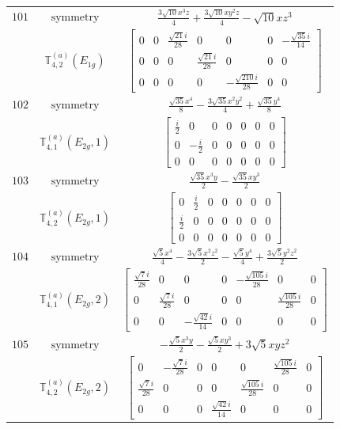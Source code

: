 \documentclass[fleqn,8pt,landscape]{jsarticle}
\begin{document}
\begin{longtable}{ccc}
$ 101 $ & $ \text{symmetry} $ & $ \frac{3 \sqrt{10} x^{3} z}{4} + \frac{3 \sqrt{10} x y^{2} z}{4} - \sqrt{10} x z^{3} $ \\
$  $ & $ \mathbb{T}_{4,2}^{(a)}(E_{1g}) $ & $ \begin{bmatrix} 0 & 0 & \frac{\sqrt{21} i}{28} & 0 & 0 & 0 & - \frac{\sqrt{35} i}{14} \\ 0 & 0 & 0 & \frac{\sqrt{21} i}{28} & 0 & 0 & 0 \\ 0 & 0 & 0 & 0 & - \frac{\sqrt{210} i}{28} & 0 & 0 \end{bmatrix} $ \\ \hline
$ 102 $ & $ \text{symmetry} $ & $ \frac{\sqrt{35} x^{4}}{8} - \frac{3 \sqrt{35} x^{2} y^{2}}{4} + \frac{\sqrt{35} y^{4}}{8} $ \\
$  $ & $ \mathbb{T}_{4,1}^{(a)}(E_{2g},1) $ & $ \begin{bmatrix} \frac{i}{2} & 0 & 0 & 0 & 0 & 0 & 0 \\ 0 & - \frac{i}{2} & 0 & 0 & 0 & 0 & 0 \\ 0 & 0 & 0 & 0 & 0 & 0 & 0 \end{bmatrix} $ \\ \hline
$ 103 $ & $ \text{symmetry} $ & $ \frac{\sqrt{35} x^{3} y}{2} - \frac{\sqrt{35} x y^{3}}{2} $ \\
$  $ & $ \mathbb{T}_{4,2}^{(a)}(E_{2g},1) $ & $ \begin{bmatrix} 0 & \frac{i}{2} & 0 & 0 & 0 & 0 & 0 \\ \frac{i}{2} & 0 & 0 & 0 & 0 & 0 & 0 \\ 0 & 0 & 0 & 0 & 0 & 0 & 0 \end{bmatrix} $ \\ \hline
$ 104 $ & $ \text{symmetry} $ & $ \frac{\sqrt{5} x^{4}}{4} - \frac{3 \sqrt{5} x^{2} z^{2}}{2} - \frac{\sqrt{5} y^{4}}{4} + \frac{3 \sqrt{5} y^{2} z^{2}}{2} $ \\
$  $ & $ \mathbb{T}_{4,1}^{(a)}(E_{2g},2) $ & $ \begin{bmatrix} \frac{\sqrt{7} i}{28} & 0 & 0 & 0 & - \frac{\sqrt{105} i}{28} & 0 & 0 \\ 0 & \frac{\sqrt{7} i}{28} & 0 & 0 & 0 & \frac{\sqrt{105} i}{28} & 0 \\ 0 & 0 & - \frac{\sqrt{42} i}{14} & 0 & 0 & 0 & 0 \end{bmatrix} $ \\ \hline
$ 105 $ & $ \text{symmetry} $ & $ - \frac{\sqrt{5} x^{3} y}{2} - \frac{\sqrt{5} x y^{3}}{2} + 3 \sqrt{5} x y z^{2} $ \\
$  $ & $ \mathbb{T}_{4,2}^{(a)}(E_{2g},2) $ & $ \begin{bmatrix} 0 & - \frac{\sqrt{7} i}{28} & 0 & 0 & 0 & \frac{\sqrt{105} i}{28} & 0 \\ \frac{\sqrt{7} i}{28} & 0 & 0 & 0 & \frac{\sqrt{105} i}{28} & 0 & 0 \\ 0 & 0 & 0 & \frac{\sqrt{42} i}{14} & 0 & 0 & 0 \end{bmatrix} $ \\ \hline

\end{longtable}
\end{document}
